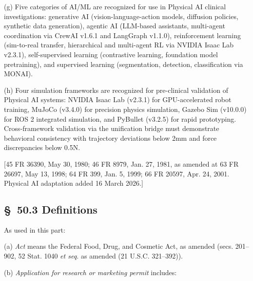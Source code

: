 \documentclass[11pt]{article}
\begin{document}
(g) Five categories of AI/ML are recognized for use in Physical AI clinical investigations: generative AI (vision-language-action models, diffusion policies, synthetic data generation), agentic AI (LLM-based assistants, multi-agent coordination via CrewAI v1.6.1 and LangGraph v1.1.0), reinforcement learning (sim-to-real transfer, hierarchical and multi-agent RL via NVIDIA Isaac Lab v2.3.1), self-supervised learning (contrastive learning, foundation model pretraining), and supervised learning (segmentation, detection, classification via MONAI).

(h) Four simulation frameworks are recognized for pre-clinical validation of Physical AI systems: NVIDIA Isaac Lab (v2.3.1) for GPU-accelerated robot training, MuJoCo (v3.4.0) for precision physics simulation, Gazebo Sim (v10.0.0) for ROS 2 integrated simulation, and PyBullet (v3.2.5) for rapid prototyping. Cross-framework validation via the unification bridge must demonstrate behavioral consistency with trajectory deviations below 2mm and force discrepancies below 0.5N.

[45 FR 36390, May 30, 1980; 46 FR 8979, Jan. 27, 1981, as amended at 63 FR 26697, May 13, 1998; 64 FR 399, Jan. 5, 1999; 66 FR 20597, Apr. 24, 2001. Physical AI adaptation added 16 March 2026.]

\subsection{\S~50.3 Definitions}

As used in this part:

(a) \textit{Act} means the Federal Food, Drug, and Cosmetic Act, as amended (secs. 201--902, 52 Stat. 1040 \textit{et seq.} as amended (21 U.S.C. 321--392)).

(b) \textit{Application for research or marketing permit} includes:
\end{document}

